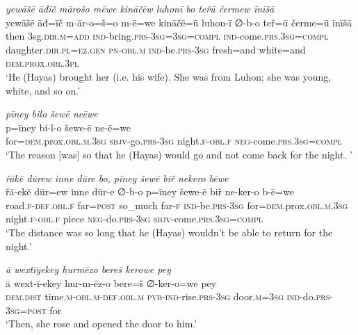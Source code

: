 \ea \label{ŽH.65}
\textit{yewāšē āđīč mārošo mēwe kināčēw luhonī bo teřū čermew īnīšā} \\ 
\gll yewāšē āđ=īč m-ār-o=š=o m-ē=we kināčē=ū luhon-ī ∅-b-o teř=ū čerme=ū īnīšā \\ 
 then 3sg\textsc{.dir}\textsc{.m}\textsc{=add} \textsc{ind-}bring\textsc{.prs}\textsc{-3sg}\textsc{=3sg}\textsc{=compl} \textsc{ind-}come\textsc{.prs}\textsc{.3sg}\textsc{=compl} daughter\textsc{.dir}\textsc{.pl}\textsc{=ez}\textsc{.gen} \textsc{pn}\textsc{-obl}\textsc{.m} \textsc{ind-}be\textsc{.prs}\textsc{-3sg} fresh=and white=and \textsc{dem.prox}\textsc{.obl}\textsc{.3pl} \\ 
\glt `He (Hayas) brought her (i.e. his wife). She was from Luhon; she was young, white, and so on.'
\z 
 
\ea \label{ŽH.70}
\textit{pīney bilo šewē neēwe} \\ 
\gll p=īney bi-l-o šewe-ē ne-ē=we \\ 
 for\textsc{=dem}.prox\textsc{.obl}\textsc{.m}\textsc{.3sg} \textsc{sbjv-}go\textsc{.prs}\textsc{-3sg} night\textsc{\textsc{.f}}\textsc{-obl}\textsc{\textsc{.f}} \textsc{neg-}come\textsc{.prs}\textsc{.3sg}\textsc{=compl} \\ 
\glt `The reason [was] so that he (Hayas) would go and not come back for the night. '
\z 
 
\ea \label{ŽH.71}
\textit{řākē dūrew inne dūre bo, pīney šewē biř nekero bēwe} \\ 
\gll řā-ekē dūr=ew inne dūr-e ∅-b-o p=īney šewe-ē biř ne-ker-o b-ē=we \\ 
 road\textsc{\textsc{.f}}\textsc{-def}\textsc{.obl}\textsc{\textsc{.f}} far\textsc{=\textsc{post}} so\_much far\textsc{-f} \textsc{ind-}be\textsc{.prs}\textsc{-3sg} for\textsc{=dem}.prox\textsc{.obl}\textsc{.m}\textsc{.3sg} night\textsc{\textsc{.f}}\textsc{-obl}\textsc{\textsc{.f}} piece \textsc{neg-}do\textsc{.prs}\textsc{-3sg} \textsc{sbjv-}come\textsc{.prs}\textsc{.3sg}\textsc{=compl} \\ 
\glt `The distance was so long that he (Hayas) wouldn’t be able to return for the night.'
\z 
 
\ea \label{ŽH.75}
\textit{ā wextīyekey hurmēzo bereš kerowe pey} \\ 
\gll ā wext-ī-ekey hur-m-ēz-o bere=š ∅-ker-o=we pey \\ 
 \textsc{dem.dist} time\textsc{.m}\textsc{-obl}\textsc{.m}\textsc{-def}\textsc{.obl}\textsc{.m} \textsc{pvb-}\textsc{ind-}rise\textsc{.prs}\textsc{-3sg} door\textsc{.m}\textsc{=3sg} \textsc{ind-}do\textsc{.prs}\textsc{-3sg}\textsc{=\textsc{post}} for \\ 
\glt `Then, she rose and opened the door to him.'
\z 
 
